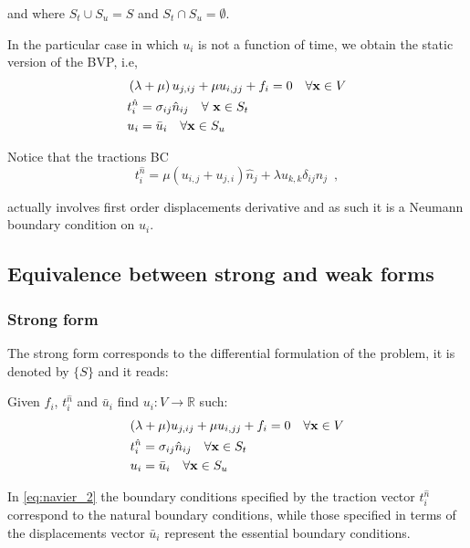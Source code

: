 and where ${S_t} \cup {S_u} = S$ and ${S_t} \cap {S_u} = \emptyset $. 


In the particular case in which $u_i$ is not a function of time, we obtain the static version of the BVP, i.e,
\begin{equation}
\begin{split}
&\left(\lambda  + \mu \right)u_{j,ij} + \mu u_{i,jj} + {f_i} = 0 \quad \forall \vb{x} \in V \\
&t_i^{\hat n} = \sigma _{ij} \hat n_{ij} \quad \forall\ \vb{x} \in S_t\\
& {u_i} = \bar{u}_i \quad \forall \vb x \in S_u
\end{split}
\end{equation}

Notice that the tractions BC 
\[t_i^{\hat n} = \mu (u_{i,j} + u_{j,i}) \hat{n}_j + \lambda u_{k,k} \delta_{ij}\hat{n}_j \enspace ,\]

actually involves first order displacements derivative and as such it is a Neumann boundary condition on $u_i$.
%

\subsection{Equivalence between strong and weak forms}
\subsubsection{Strong form}
The strong form corresponds to the differential formulation of the problem, it is denoted by $\{ S \}$ and it reads:

Given $f_i$, $t_i^{\hat n}$ and ${\bar u_i}$ find ${u_i}:V \to \mathbb{R}$ such:
%
\begin{equation} \label{eq:navier_2}
\begin{split}
&(\lambda  + \mu)u_{j,ij} + \mu u_{i,jj} + f_i = 0 \quad \forall \vb{x} \in V \\
&t_i^{\hat n} = \sigma _{ij} \hat{n}_{ij} \quad \forall \vb{x} \in S_t\\
&u_i = \bar{u}_i \quad \forall \vb{x} \in S_u
\end{split}
\end{equation}

In \cref{eq:navier_2} the boundary conditions specified by the traction vector $t_i^{\hat n}$ correspond to the natural boundary conditions, while those specified in terms of the displacements vector $\bar u_i$ represent the essential boundary conditions.

